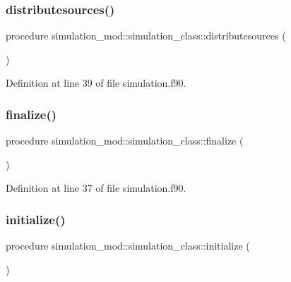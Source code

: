 \subsubsection{\texorpdfstring{distributesources()}{distributesources()}}
{\footnotesize\ttfamily procedure simulation\+\_\+mod\+::simulation\+\_\+class\+::distributesources (\begin{DoxyParamCaption}{ }\end{DoxyParamCaption})\hspace{0.3cm}{\ttfamily [private]}}



Definition at line 39 of file simulation.\+f90.

\mbox{\label{structsimulation__mod_1_1simulation__class_a7699b373324ef011e2d514173681eb2a}} 
\subsubsection{\texorpdfstring{finalize()}{finalize()}}
{\footnotesize\ttfamily procedure simulation\+\_\+mod\+::simulation\+\_\+class\+::finalize (\begin{DoxyParamCaption}{ }\end{DoxyParamCaption})\hspace{0.3cm}{\ttfamily [private]}}



Definition at line 37 of file simulation.\+f90.

\mbox{\label{structsimulation__mod_1_1simulation__class_a8bfe8e1f97c7cbdfc2617da0355f65a5}} 
\subsubsection{\texorpdfstring{initialize()}{initialize()}}
{\footnotesize\ttfamily procedure simulation\+\_\+mod\+::simulation\+\_\+class\+::initialize (\begin{DoxyParamCaption}{ }\end{DoxyParamCaption})\hspace{0.3cm}{\ttfamily [private]}}



